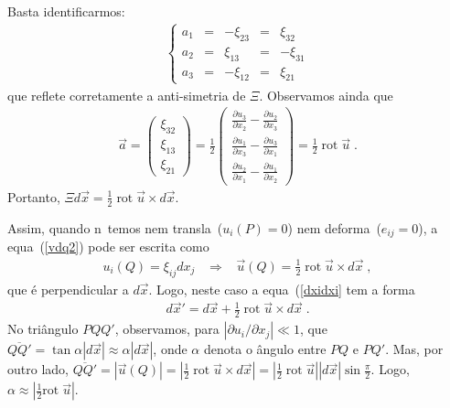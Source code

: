 Basta identificarmos:
\begin{eqnarray}
\left\{
\begin{array}{ccccc}
a_1 & = & -\xi_{23} & = & \xi_{32} \\
a_2 & = & \xi_{13} & = & -\xi_{31} \\
a_3 & = & -\xi_{12} & = & \xi_{21}
\end{array} \right.
\end{eqnarray}
que reflete corretamente a anti-simetria de $\Xi$.
Observamos ainda que
\begin{eqnarray}
\vec{a} = \left(
\begin{array}{c}
\xi_{32} \\
\xi_{13} \\
\xi_{21}
\end{array} \right)
= \frac{1}{2}  \left(
\begin{array}{c}
\frac{\partial u_3}{\partial x_2}-\frac{\partial u_2}
{\partial x_3}\\
\frac{\partial u_1}{\partial x_3}-\frac{\partial u_3}
{\partial x_1}\\
\frac{\partial u_2}{\partial x_1}-\frac{\partial u_1}
{\partial x_2}
\end{array} \right)
= \frac{1}{2} \; \mbox{rot} \; \vec{u} \; .
\end{eqnarray}
Portanto, $\Xi d\vec{x} = \frac{1}{2} \; \mbox{rot}
\;\vec{u} \times d\vec{x}$.

Assim, quando n\ao\ temos nem transla\cao\ ($u_i(P)=0$) nem deforma\cao\
($e_{ij}=0$), a equa\cao\ (\ref{vdq2}) pode ser escrita como
\begin{eqnarray}
u_i(Q) = \xi_{ij} dx_j \; \; \; \Longrightarrow \; \; \;
\vec{u}(Q) = \frac{1}{2} \;\mbox{rot}\; \vec{u}\times
d\vec{x} \; ,
\end{eqnarray}
que \'e perpendicular a $d\vec{x}$.
Logo, neste caso a equa\cao\ (\ref{dxidxi}
tem a forma
\begin{eqnarray}
d\vec{x}' = d\vec{x} + \frac{1}{2} \;\mbox{rot}\; \vec{u}\times
d\vec{x} \; .
\end{eqnarray}
No tri\^angulo $PQQ'$, observamos, para $|\partial u_i/\partial x_j|\ll 1$,
que $\overline{QQ'} = \tan \alpha |d\vec{x}| \approx
\alpha |d\vec{x}|$, onde $\alpha$ denota o \^angulo entre $PQ$ e $PQ'$.
Mas, por outro lado, $\overline{QQ'} = |\vec{u}(Q)|=
\mbox{$|\frac{1}{2} \; \mbox{rot} \; \vec{u} \times
d\vec{x}|$} = |\frac{1}{2} \; \mbox{rot} \; \vec{u}|
|d\vec{x}| \sin \frac{\pi}{2}$. Logo, $\alpha \approx
|\frac{1}{2} \mbox{rot} \; \vec{u}|$. 

